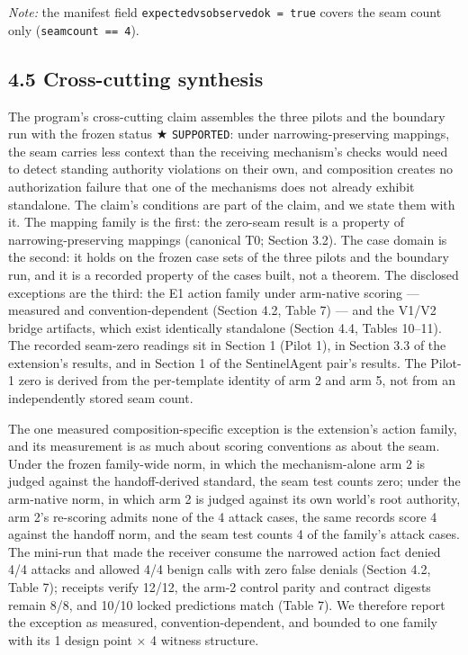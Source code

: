 \documentclass[
  10pt,
]{article}
\newcounter{none} %
\let\origtexttt\texttt
\renewcommand{\texttt}[1]{{\upshape\origtexttt{#1}}}
\renewcommand{\_}{\origunderscore\allowbreak}
\begin{document}
\emph{Note:} the manifest field
\texttt{expected\_vs\_observed\_ok\ =\ true} covers the seam count only
(\texttt{seam\_count\ ==\ 4}).

\subsection{4.5 Cross-cutting synthesis}\label{cross-cutting-synthesis}

The program's cross-cutting claim assembles the three pilots and the
boundary run with the frozen status ★ \texttt{SUPPORTED}: under
narrowing-preserving mappings, the seam carries less context than the
receiving mechanism's checks would need to detect standing authority
violations on their own, and composition creates no authorization
failure that one of the mechanisms does not already exhibit standalone.
The claim's conditions are part of the claim, and we state them with it.
The mapping family is the first: the zero-seam result is a property of
narrowing-preserving mappings (canonical T0; Section 3.2). The case
domain is the second: it holds on the frozen case sets of the three
pilots and the boundary run, and it is a recorded property of the cases
built, not a theorem. The disclosed exceptions are the third: the E1
action family under arm-native scoring --- measured and
convention-dependent (Section 4.2, Table 7) --- and the V1/V2 bridge
artifacts, which exist identically standalone (Section 4.4, Tables
10--11). The recorded seam-zero readings sit in
Section 1 (Pilot 1), in Section 3.3 of the extension's results, and in
Section 1 of the SentinelAgent pair's results. The Pilot-1 zero is
derived from the per-template identity of arm 2 and arm 5, not from an
independently stored seam count.

The one measured composition-specific exception is the extension's
action family, and its measurement is as much about scoring conventions
as about the seam. Under the frozen family-wide norm, in which the
mechanism-alone arm 2 is judged against the handoff-derived standard,
the seam test counts zero; under the arm-native norm, in which arm 2 is
judged against its own world's root authority, arm 2's re-scoring admits
none of the 4 attack cases, the same records score 4 against the handoff
norm, and the seam test counts 4 of the family's attack cases. The
mini-run that made the receiver consume the narrowed action fact denied
4/4 attacks and allowed 4/4 benign calls with zero false denials
(Section 4.2, Table 7); receipts verify 12/12, the arm-2 control parity
and contract digests remain 8/8, and 10/10 locked predictions match
(Table 7). We therefore report the exception as measured,
convention-dependent, and bounded to one family with its 1 design point
× 4 witness structure.
\end{document}
